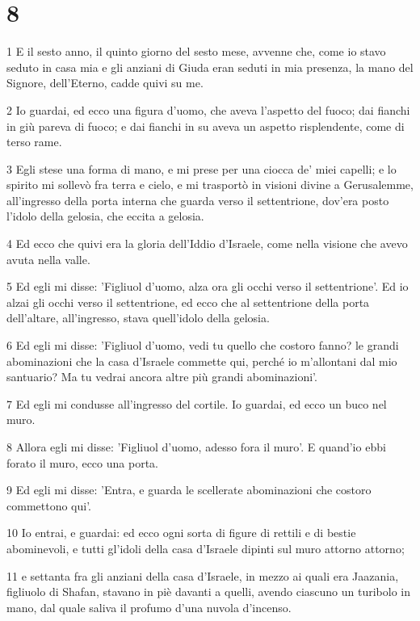 \chapter{8}

\par 1 E il sesto anno, il quinto giorno del sesto mese, avvenne che, come io stavo seduto in casa mia e gli anziani di Giuda eran seduti in mia presenza, la mano del Signore, dell'Eterno, cadde quivi su me.
\par 2 Io guardai, ed ecco una figura d'uomo, che aveva l'aspetto del fuoco; dai fianchi in giù pareva di fuoco; e dai fianchi in su aveva un aspetto risplendente, come di terso rame.
\par 3 Egli stese una forma di mano, e mi prese per una ciocca de' miei capelli; e lo spirito mi sollevò fra terra e cielo, e mi trasportò in visioni divine a Gerusalemme, all'ingresso della porta interna che guarda verso il settentrione, dov'era posto l'idolo della gelosia, che eccita a gelosia.
\par 4 Ed ecco che quivi era la gloria dell'Iddio d'Israele, come nella visione che avevo avuta nella valle.
\par 5 Ed egli mi disse: 'Figliuol d'uomo, alza ora gli occhi verso il settentrione'. Ed io alzai gli occhi verso il settentrione, ed ecco che al settentrione della porta dell'altare, all'ingresso, stava quell'idolo della gelosia.
\par 6 Ed egli mi disse: 'Figliuol d'uomo, vedi tu quello che costoro fanno? le grandi abominazioni che la casa d'Israele commette qui, perché io m'allontani dal mio santuario? Ma tu vedrai ancora altre più grandi abominazioni'.
\par 7 Ed egli mi condusse all'ingresso del cortile. Io guardai, ed ecco un buco nel muro.
\par 8 Allora egli mi disse: 'Figliuol d'uomo, adesso fora il muro'. E quand'io ebbi forato il muro, ecco una porta.
\par 9 Ed egli mi disse: 'Entra, e guarda le scellerate abominazioni che costoro commettono qui'.
\par 10 Io entrai, e guardai: ed ecco ogni sorta di figure di rettili e di bestie abominevoli, e tutti gl'idoli della casa d'Israele dipinti sul muro attorno attorno;
\par 11 e settanta fra gli anziani della casa d'Israele, in mezzo ai quali era Jaazania, figliuolo di Shafan, stavano in piè davanti a quelli, avendo ciascuno un turibolo in mano, dal quale saliva il profumo d'una nuvola d'incenso.
